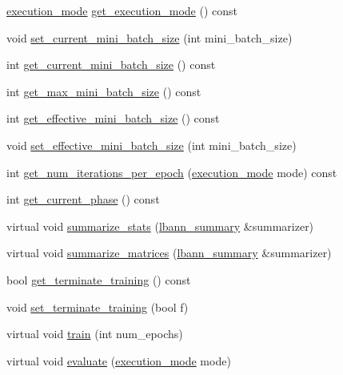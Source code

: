 \begin{DoxyCompactItemize}
\item 
\hyperlink{base_8hpp_a2781a159088df64ed7d47cc91c4dc0a8}{execution\+\_\+mode} \hyperlink{classlbann_1_1model_addb40597cf29aa6d31b6a7d09ef48608}{get\+\_\+execution\+\_\+mode} () const
\item 
void \hyperlink{classlbann_1_1model_a4f3cc91f8495870723389be15f77184a}{set\+\_\+current\+\_\+mini\+\_\+batch\+\_\+size} (int mini\+\_\+batch\+\_\+size)
\item 
int \hyperlink{classlbann_1_1model_a3eaad8fd538b99ecab9afca6dc3327fd}{get\+\_\+current\+\_\+mini\+\_\+batch\+\_\+size} () const
\item 
int \hyperlink{classlbann_1_1model_a8c311798ff4acaeafdfbf85162ba5084}{get\+\_\+max\+\_\+mini\+\_\+batch\+\_\+size} () const
\item 
int \hyperlink{classlbann_1_1model_a2a9b4cfa1c8c91e4131908751f9c4a6a}{get\+\_\+effective\+\_\+mini\+\_\+batch\+\_\+size} () const
\item 
void \hyperlink{classlbann_1_1model_aa64829cba8a84928a396893172a1d116}{set\+\_\+effective\+\_\+mini\+\_\+batch\+\_\+size} (int mini\+\_\+batch\+\_\+size)
\item 
int \hyperlink{classlbann_1_1model_a32a189033b8ff92d233781b1039c70f1}{get\+\_\+num\+\_\+iterations\+\_\+per\+\_\+epoch} (\hyperlink{base_8hpp_a2781a159088df64ed7d47cc91c4dc0a8}{execution\+\_\+mode} mode) const
\item 
int \hyperlink{classlbann_1_1model_afd569027be9b7a6adb08f486331384ac}{get\+\_\+current\+\_\+phase} () const
\item 
virtual void \hyperlink{classlbann_1_1model_a1eb5efcc8f73ba9478b2ce1efb9f2d8c}{summarize\+\_\+stats} (\hyperlink{classlbann_1_1lbann__summary}{lbann\+\_\+summary} \&summarizer)
\item 
virtual void \hyperlink{classlbann_1_1model_a0824e757e4806fad77630d69926a8911}{summarize\+\_\+matrices} (\hyperlink{classlbann_1_1lbann__summary}{lbann\+\_\+summary} \&summarizer)
\item 
bool \hyperlink{classlbann_1_1model_a90363b6a20269cf7197701e49f1f52a3}{get\+\_\+terminate\+\_\+training} () const
\item 
void \hyperlink{classlbann_1_1model_a5bafc4e84671490c6118959becb22e16}{set\+\_\+terminate\+\_\+training} (bool f)
\item 
virtual void \hyperlink{classlbann_1_1model_a11c79dc3783d11b799bdc40ff9c92ddc}{train} (int num\+\_\+epochs)
\item 
virtual void \hyperlink{classlbann_1_1model_a4191097fdbcd1686525e9cd150f958ef}{evaluate} (\hyperlink{base_8hpp_a2781a159088df64ed7d47cc91c4dc0a8}{execution\+\_\+mode} mode)

\end{DoxyCompactItemize}
